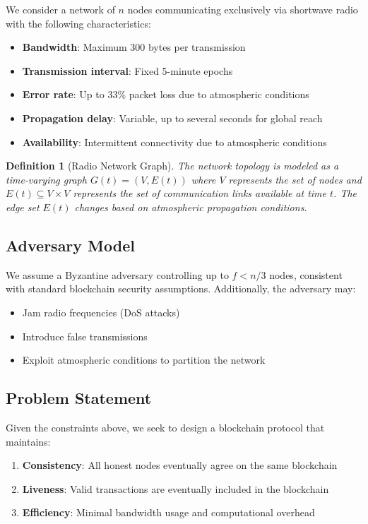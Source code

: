 \documentclass[11pt,a4paper]{article}
\newtheorem{definition}[theorem]{Definition}
\begin{document}
We consider a network of $n$ nodes communicating exclusively via shortwave radio with the following characteristics:

\begin{itemize}
\item \textbf{Bandwidth}: Maximum 300 bytes per transmission
\item \textbf{Transmission interval}: Fixed 5-minute epochs
\item \textbf{Error rate}: Up to 33\% packet loss due to atmospheric conditions
\item \textbf{Propagation delay}: Variable, up to several seconds for global reach
\item \textbf{Availability}: Intermittent connectivity due to atmospheric conditions
\end{itemize}

\begin{definition}[Radio Network Graph]
The network topology is modeled as a time-varying graph $G(t) = (V, E(t))$ where $V$ represents the set of nodes and $E(t) \subseteq V \times V$ represents the set of communication links available at time $t$. The edge set $E(t)$ changes based on atmospheric propagation conditions.
\end{definition}

\subsection{Adversary Model}

We assume a Byzantine adversary controlling up to $f < n/3$ nodes, consistent with standard blockchain security assumptions. Additionally, the adversary may:

\begin{itemize}
\item Jam radio frequencies (DoS attacks)
\item Introduce false transmissions
\item Exploit atmospheric conditions to partition the network
\end{itemize}

\subsection{Problem Statement}

Given the constraints above, we seek to design a blockchain protocol that maintains:

\begin{enumerate}
\item \textbf{Consistency}: All honest nodes eventually agree on the same blockchain
\item \textbf{Liveness}: Valid transactions are eventually included in the blockchain
\item \textbf{Efficiency}: Minimal bandwidth usage and computational overhead
\end{enumerate}
\end{document}

